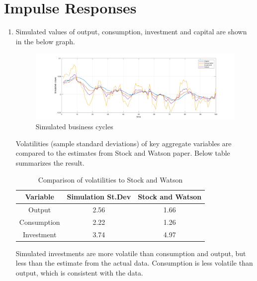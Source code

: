 \documentclass[11pt]{amsart}
\begin{document}
\section{Impulse Responses}
\begin{enumerate}[label = (\alph*)]
	\item Simulated values of output, consumption, investment and capital are shown in the below graph. 
	\begin{figure}[H]
		\centering
		\includegraphics[width=1\textwidth]{5a_Minki.png}
		\caption{Simulated business cycles}
	\end{figure}
    Volatilities (sample standard deviations) of key aggregate variables are compared to the estimates from Stock and Watson paper. Below table summarizes the result. 
    \begin{table}[H]
    	\centering
    	\begin{tabular}{ccc}
    		\hline \hline 
    		 \bf Variable  & \bf Simulation St.Dev           & \bf Stock and Watson \\
    		\hline 
    	    Output                &  2.56       &   1.66      \\
    		Consumption      &   2.22      &   1.26         \\
    	    Investment         &   3.74      &    4.97       \\
    		\hline
    	\end{tabular}
    	\caption{Comparison of volatilities to Stock and Watson }
    \end{table}
    Simulated investments are more volatile than consumption and output, but less than the estimate from the actual data. Consumption is less volatile than output, which is consistent with the data. 
    

\end{enumerate}
\end{document}
